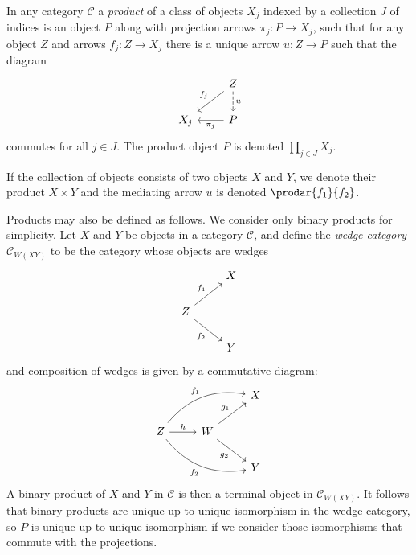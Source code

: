 \documentclass[article, a4paper, 11pt, oneside]{memoir}
\numberwithin{equation}{chapter}
\newcommand{\cat}[1]{\mathcal{#1}}
\newcommand{\catC}{\cat{C}}
\begin{document}
\begin{definition}[Products]
    In any category $\catC$ a \emph{product} of a class of objects $X_j$ indexed by a collection $J$ of indices is an object $P$ along with projection arrows $\pi_j \colon P \to X_j$, such that for any object $Z$ and arrows $f_j \colon Z \to X_j$ there is a unique arrow $u \colon Z \to P$ such that the diagram
    \begin{equation*}
        \begin{tikzcd}
            & Z
                \ar[dl, "f_j", swap]
                \ar[d, "u", dashed]
            \\
            X_j
            & P
                \ar[l, "\pi_j"]
        \end{tikzcd}
    \end{equation*}
    commutes for all $j \in J$. The product object $P$ is denoted $\prod_{j \in J} X_j$.

    If the collection of objects consists of two objects $X$ and $Y$, we denote their product $X \times Y$ and the mediating arrow $u$ is denoted $\prodar{f_1}{f_2}$.
\end{definition}
%
Products may also be defined as follows. We consider only binary products for simplicity. Let $X$ and $Y$ be objects in a category $\catC$, and define the \emph{wedge category} $\catC_{W(XY)}$ to be the category whose objects are wedges
%
\begin{equation*}
    \begin{tikzcd}
        & X
        \\
        Z
            \ar[ur, "f_1"]
            \ar[dr, "f_2", swap]
        \\
        & Y
    \end{tikzcd}
\end{equation*}
%
and composition of wedges is given by a commutative diagram:
%
\begin{equation*}
    \begin{tikzcd}
        && X
        \\
        Z
            \ar[urr, "f_1", bend left]
            \ar[drr, "f_2", bend right, swap]
            \ar[r, "h"]
        & W
            \ar[ur, "g_1"]
            \ar[dr, "g_2", swap]
        \\
        && Y
    \end{tikzcd}
\end{equation*}
%
A binary product of $X$ and $Y$ in $\catC$ is then a terminal object in $\catC_{W(XY)}$. It follows that binary products are unique up to unique isomorphism in the wedge category, so $P$ is unique up to unique isomorphism if we consider those isomorphisms that commute with the projections.
\end{document}
